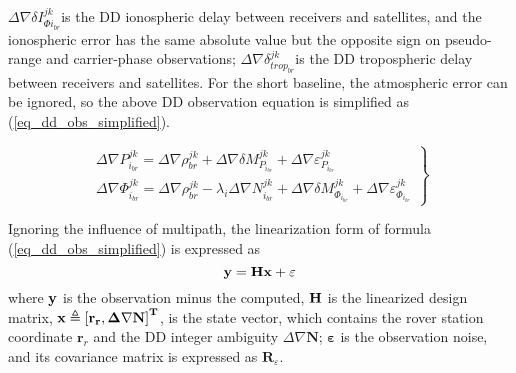 \documentclass[journal]{IEEEtran}
\begin{document}
$\Delta \nabla \delta I_{\Phi {{i}_{br}}}^{jk}$is the DD ionospheric delay between receivers and satellites, and the ionospheric error has the same absolute value but the opposite sign on pseudo-range and carrier-phase observations\cite{teunissen2017springer}; $\Delta \nabla \delta _{tro{{p}_{br}}}^{jk}$is the DD tropospheric delay between receivers and satellites. 
For the short baseline, the atmospheric error can be ignored, so the above DD observation equation is simplified as (\ref{eq_dd_obs_simplified}).
\begin{figure*}
	\begin{equation}
	\left. \begin{array}{l}
	\Delta \nabla P_{{i_{br}}}^{jk} = \Delta \nabla \rho _{br}^{jk} + \Delta \nabla \delta M_{{P_{{i_{br}}}}}^{jk} + \Delta \nabla \varepsilon _{{P_{{i_{br}}}}}^{jk}\\
	\Delta \nabla \Phi _{{i_{br}}}^{jk} = \Delta \nabla \rho _{br}^{jk} - {\lambda _i}\Delta \nabla N_{{i_{br}}}^{jk} + \Delta \nabla \delta M_{{\Phi _{{i_{br}}}}}^{jk} + \Delta \nabla \varepsilon _{{\Phi _{{i_{br}}}}}^{jk}\end{array} \right\}
	\label{eq_dd_obs_simplified}
	\end{equation}
	
\end{figure*}
Ignoring the influence of multipath, the linearization form of formula (\ref{eq_dd_obs_simplified}) is expressed as
\begin{equation}
\label{eq_rtk_measure}
{\bf{y}} = {\bf{Hx}} + {\bf{\varepsilon }}
\end{equation}
where $\bf{y}$ is the observation minus the computed,  $\bf{H} $ is the linearized design matrix\cite{hofmann-wellenhof2007gnss}, $\bf{x}\triangleq {{[{{\mathbf{r}}_{r}},\Delta \nabla \mathbf{N}]}^{T}}$, is the state vector, which contains the rover station coordinate ${{\mathbf{r}}_{r}}$ and the DD integer ambiguity $\Delta \nabla \mathbf{N}$;  $\mathbf{\varepsilon } $ is the observation noise, and its covariance matrix is expressed as  ${{\mathbf{R}}_{\varepsilon }} $. 
\end{document}
